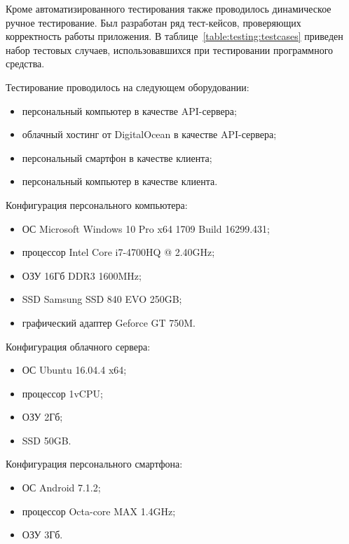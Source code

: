 Кроме  автоматизированного  тестирования  также  проводилось динамическое ручное тестирование. Был  разработан  ряд  тест-кейсов, проверяющих корректность работы приложения. В таблице~\ref{table:testing:testcases}  приведен набор тестовых случаев, использовавшихся при тестировании программного средства.

Тестирование проводилось на следующем оборудовании:

\begin{itemize}
	\item персональный компьютер в качестве API-сервера;
	\item облачный хостинг от DigitalOcean в качестве API-сервера;
	\item персональный смартфон в качестве клиента;
	\item персональный компьютер в качестве клиента.
\end{itemize}

Конфигурация персонального компьютера:

\begin{itemize}
	\item ОС Microsoft Windows 10 Pro x64 1709 Build 16299.431;
	\item процессор Intel Core i7-4700HQ @ 2.40GHz;
	\item ОЗУ 16Гб DDR3 1600MHz;
	\item SSD Samsung SSD 840 EVO 250GB;
	\item графический адаптер Geforce GT 750M.
\end{itemize}

Конфигурация облачного сервера:

\begin{itemize}
	\item ОС Ubuntu 16.04.4 x64;
	\item процессор 1vCPU;
	\item ОЗУ 2Гб;
	\item SSD 50GB.
\end{itemize}

Конфигурация персонального смартфона:

\begin{itemize}
	\item ОС Android 7.1.2;
	\item процессор Octa-core MAX 1.4GHz;
	\item ОЗУ 3Гб.
\end{itemize}

